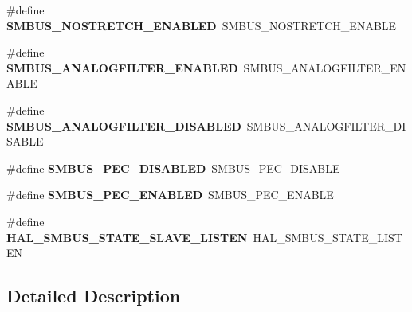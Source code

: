\begin{DoxyCompactItemize}
\item 
\#define {\bfseries S\+M\+B\+U\+S\+\_\+\+N\+O\+S\+T\+R\+E\+T\+C\+H\+\_\+\+E\+N\+A\+B\+L\+ED}~S\+M\+B\+U\+S\+\_\+\+N\+O\+S\+T\+R\+E\+T\+C\+H\+\_\+\+E\+N\+A\+B\+LE\hypertarget{group___h_a_l___s_m_b_u_s___aliased___defines_gac13cdfb033be4b09e90f8d65745d48c2}{}\label{group___h_a_l___s_m_b_u_s___aliased___defines_gac13cdfb033be4b09e90f8d65745d48c2}

\item 
\#define {\bfseries S\+M\+B\+U\+S\+\_\+\+A\+N\+A\+L\+O\+G\+F\+I\+L\+T\+E\+R\+\_\+\+E\+N\+A\+B\+L\+ED}~S\+M\+B\+U\+S\+\_\+\+A\+N\+A\+L\+O\+G\+F\+I\+L\+T\+E\+R\+\_\+\+E\+N\+A\+B\+LE\hypertarget{group___h_a_l___s_m_b_u_s___aliased___defines_gaf636bd945246ff29d4e35ee3be6f1f6d}{}\label{group___h_a_l___s_m_b_u_s___aliased___defines_gaf636bd945246ff29d4e35ee3be6f1f6d}

\item 
\#define {\bfseries S\+M\+B\+U\+S\+\_\+\+A\+N\+A\+L\+O\+G\+F\+I\+L\+T\+E\+R\+\_\+\+D\+I\+S\+A\+B\+L\+ED}~S\+M\+B\+U\+S\+\_\+\+A\+N\+A\+L\+O\+G\+F\+I\+L\+T\+E\+R\+\_\+\+D\+I\+S\+A\+B\+LE\hypertarget{group___h_a_l___s_m_b_u_s___aliased___defines_ga2af661132b3a2cd8c964dc2104f8223d}{}\label{group___h_a_l___s_m_b_u_s___aliased___defines_ga2af661132b3a2cd8c964dc2104f8223d}

\item 
\#define {\bfseries S\+M\+B\+U\+S\+\_\+\+P\+E\+C\+\_\+\+D\+I\+S\+A\+B\+L\+ED}~S\+M\+B\+U\+S\+\_\+\+P\+E\+C\+\_\+\+D\+I\+S\+A\+B\+LE\hypertarget{group___h_a_l___s_m_b_u_s___aliased___defines_ga8f509e1a8b4bbcd2f687f066e8dafffb}{}\label{group___h_a_l___s_m_b_u_s___aliased___defines_ga8f509e1a8b4bbcd2f687f066e8dafffb}

\item 
\#define {\bfseries S\+M\+B\+U\+S\+\_\+\+P\+E\+C\+\_\+\+E\+N\+A\+B\+L\+ED}~S\+M\+B\+U\+S\+\_\+\+P\+E\+C\+\_\+\+E\+N\+A\+B\+LE\hypertarget{group___h_a_l___s_m_b_u_s___aliased___defines_ga446c885b16518a909013c12085584e21}{}\label{group___h_a_l___s_m_b_u_s___aliased___defines_ga446c885b16518a909013c12085584e21}

\item 
\#define {\bfseries H\+A\+L\+\_\+\+S\+M\+B\+U\+S\+\_\+\+S\+T\+A\+T\+E\+\_\+\+S\+L\+A\+V\+E\+\_\+\+L\+I\+S\+T\+EN}~H\+A\+L\+\_\+\+S\+M\+B\+U\+S\+\_\+\+S\+T\+A\+T\+E\+\_\+\+L\+I\+S\+T\+EN\hypertarget{group___h_a_l___s_m_b_u_s___aliased___defines_ga76b21c836a3097828fdb6635777414ae}{}\label{group___h_a_l___s_m_b_u_s___aliased___defines_ga76b21c836a3097828fdb6635777414ae}

\end{DoxyCompactItemize}


\subsection{Detailed Description}
